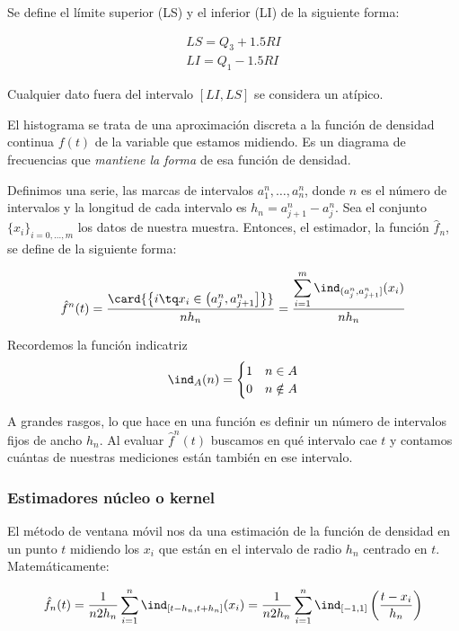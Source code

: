 \documentclass{apuntes}
\begin{document}
\begin{defn} Se define el límite superior (LS) y el inferior (LI) de la siguiente forma:

\begin{gather*}
LS = Q_3 + 1.5 RI \\
LI = Q_1 - 1.5 RI 
\end{gather*}

Cualquier dato fuera del intervalo $[LI, LS]$ se considera un atípico.
\end{defn}

\begin{defn}[Histograma]
El histograma se trata de una aproximación discreta a la función de densidad continua $f(t)$ de la variable que estamos midiendo. Es un diagrama de frecuencias que \textit{mantiene la forma} de esa función de densidad. 

Definimos una serie, las marcas de intervalos $a^n_1, \dotsc, a^n_n$, donde $n$ es el número de intervalos y la longitud de cada intervalo  es $h_n = a^n_{j+1} - a^n_j$. Sea el conjunto $\{x_i\}_{i=0,\dotsc,m}$ los datos de nuestra muestra. Entonces, el estimador, la función $\hat{f}_n$, se define de la siguiente forma:

\[ \hat{f}^n(t) = \frac{\card{\left\{i \tq x_i \in \left( a_j^n, a_{j+1}^n \right]\right\}}}{n h_n} = \frac{\displaystyle\sum_{i=1}^m \ind_{(a_j^n, a_{j+1}^n]} (x_i)}{n h_n} \]

Recordemos la función indicatriz \[ \ind_A (n) = \begin{cases} 1 & n \in A \\ 0 & n \notin A\end{cases}\]

A grandes rasgos, lo que hace en una función es definir un número de intervalos fijos de ancho $h_n$. Al evaluar $\hat{f}^n(t)$ buscamos en qué intervalo cae $t$ y contamos cuántas de nuestras mediciones están también en ese intervalo.


\end{defn}

\subsubsection{Estimadores núcleo o kernel}
\label{secEst}
\begin{defn}
El método de ventana móvil nos da una estimación de la función de densidad en un punto $t$ midiendo los $x_i$ que están en el intervalo de radio $h_n$ centrado en $t$. Matemáticamente:

\[ \hat{f}_n(t) = \frac{1}{n2h_n}\sum_{i=1}^n \ind_{[t-h_n, t+h_n]}(x_i) = \frac{1}{n2h_n}\sum_{i=1}^n \ind_{[-1,1]}\left(\frac{t-x_i}{h_n}\right) \]
\end{defn}
\end{document}
